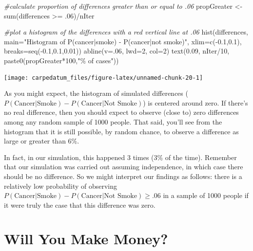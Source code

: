 \documentclass[
  openany]{book}
\newenvironment{Shaded}{\begin{snugshade}}{\end{snugshade}}
\newcommand{\AttributeTok}[1]{\textcolor[rgb]{0.77,0.63,0.00}{#1}}
\newcommand{\CommentTok}[1]{\textcolor[rgb]{0.56,0.35,0.01}{\textit{#1}}}
\newcommand{\DecValTok}[1]{\textcolor[rgb]{0.00,0.00,0.81}{#1}}
\newcommand{\FloatTok}[1]{\textcolor[rgb]{0.00,0.00,0.81}{#1}}
\newcommand{\FunctionTok}[1]{\textcolor[rgb]{0.00,0.00,0.00}{#1}}
\newcommand{\NormalTok}[1]{#1}
\newcommand{\OtherTok}[1]{\textcolor[rgb]{0.56,0.35,0.01}{#1}}
\newcommand{\SpecialCharTok}[1]{\textcolor[rgb]{0.00,0.00,0.00}{#1}}
\newcommand{\StringTok}[1]{\textcolor[rgb]{0.31,0.60,0.02}{#1}}
\begin{document}
\begin{Shaded}
\begin{Highlighting}[]
\CommentTok{\#calculate proportion of differences greater than or equal to .06}
\NormalTok{propGreater }\OtherTok{\textless{}{-}} \FunctionTok{sum}\NormalTok{(differences }\SpecialCharTok{\textgreater{}=}\NormalTok{ .}\DecValTok{06}\NormalTok{)}\SpecialCharTok{/}\NormalTok{nIter}

\CommentTok{\#plot a histogram of the differences with a red vertical line at .06}
\FunctionTok{hist}\NormalTok{(differences, }\AttributeTok{main=}\StringTok{"Histogram of P(cancer|smoke) {-} P(cancer|not smoke)"}\NormalTok{,}
     \AttributeTok{xlim=}\FunctionTok{c}\NormalTok{(}\SpecialCharTok{{-}}\FloatTok{0.1}\NormalTok{,}\FloatTok{0.1}\NormalTok{), }\AttributeTok{breaks=}\FunctionTok{seq}\NormalTok{(}\SpecialCharTok{{-}}\FloatTok{0.1}\NormalTok{,}\FloatTok{0.1}\NormalTok{,}\FloatTok{0.01}\NormalTok{))}
\FunctionTok{abline}\NormalTok{(}\AttributeTok{v=}\NormalTok{.}\DecValTok{06}\NormalTok{, }\AttributeTok{lwd=}\DecValTok{2}\NormalTok{, }\AttributeTok{col=}\DecValTok{2}\NormalTok{)}
\FunctionTok{text}\NormalTok{(}\FloatTok{0.09}\NormalTok{, nIter}\SpecialCharTok{/}\DecValTok{10}\NormalTok{, }\FunctionTok{paste0}\NormalTok{(propGreater}\SpecialCharTok{*}\DecValTok{100}\NormalTok{,}\StringTok{"\% of cases"}\NormalTok{))}
\end{Highlighting}
\end{Shaded}

\begin{center}\texttt{[image: carpedatum\_files/figure-latex/unnamed-chunk-20-1]} \end{center}

As you might expect, the histogram of simulated differences (\(P(\text{Cancer}|\text{Smoke}) - P(\text{Cancer}|\text{Not Smoke})\)) is centered around zero. If there's no real difference, then you should expect to observe (close to) zero differences among any random sample of 1000 people. That said, you'll see from the histogram that it is still possible, by random chance, to observe a difference as large or greater than 6\%.

In fact, in our simulation, this happened 3 times (3\% of the time). Remember that our simulation was carried out assuming independence, in which case there should be no difference. So we might interpret our findings as follows: there is a relatively low probability of observing \(P(\text{Cancer}|\text{Smoke}) - P(\text{Cancer}|\text{Not Smoke})\ge .06\) in a sample of 1000 people if it were truly the case that this difference was zero.

\hypertarget{will-you-make-money}{%
\chapter*{Will You Make Money?}\label{will-you-make-money}}
\end{document}
